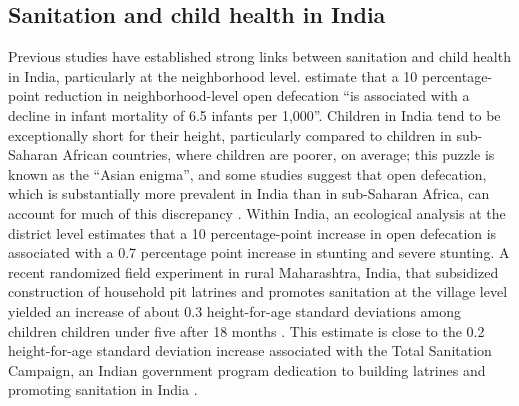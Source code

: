 \documentclass[11pt,a4paper]{article}
\begin{document}
\subsection{Sanitation and child health in India}
Previous studies have established strong links between sanitation and child health in India, particularly at the neighborhood level. \cite{geruso_spears} estimate that a 10 percentage-point reduction in neighborhood-level open defecation ``is associated with a decline in infant mortality of 6.5 infants per 1,000''. Children in India tend to be exceptionally short for their height, particularly compared to children in sub-Saharan African countries, where children are poorer, on average; this puzzle is known as the ``Asian enigma'', and some studies suggest that open defecation, which is substantially more prevalent in India than in sub-Saharan Africa, can account for much of this discrepancy \citep{spears_intl_variation}. Within India, an ecological analysis at the district level \citep{spears_ecological} estimates that a 10 percentage-point increase in open defecation is associated with a 0.7 percentage point increase in stunting and severe stunting. A recent randomized field experiment in rural Maharashtra, India, that subsidized construction of household pit latrines and promotes sanitation at the village level yielded an increase of about 0.3 height-for-age standard deviations among children children under five after 18 months \citep{village_san}. This estimate is close to the 0.2 height-for-age standard deviation increase associated with the Total Sanitation Campaign, an Indian government program dedication to building latrines and promoting sanitation in India \citep{spears_tsc}.
\end{document}
